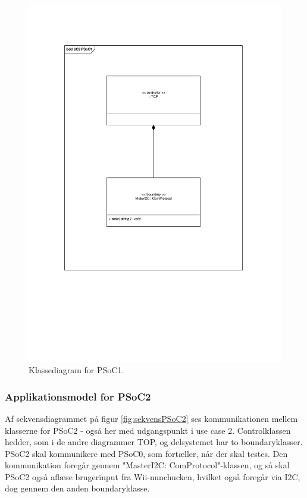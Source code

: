 \begin{figure}[H]
	\centering
	\includegraphics[trim = {1cm 7.6cm 1.8cm 3.4cm}, clip = true, width=\textwidth] {Systemarkitektur/images/klassediagramPSoC1.pdf}
	\caption{Klassediagram for PSoC1.}
	\label{fig:klassePSoC1}
\end{figure}

\subsubsection{Applikationsmodel for PSoC2}
Af sekvensdiagrammet på figur \ref{fig:sekvensPSoC2} ses kommunikationen mellem klasserne for PSoC2 - også her med udgangspunkt i use case 2. Controlklassen hedder, som i de andre diagrammer TOP, og delsystemet har to boundaryklasser. PSoC2 skal kommunikere med PSoC0, som fortæller, når der skal testes. Den kommunikation foregår gennem "MasterI2C: ComProtocol"-klassen, og så skal PSoC2 også aflæse brugerinput fra Wii-nunchucken, hvilket også foregår via I2C, dog gennem den anden boundaryklasse.

